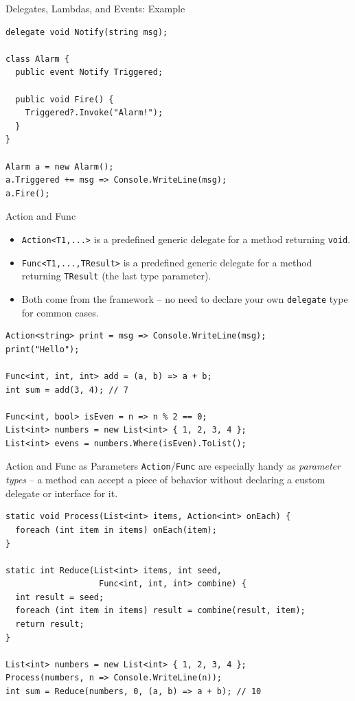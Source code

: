 \begin{frame}[fragile]{Delegates, Lambdas, and Events: Example}
  \begin{lstlisting}
delegate void Notify(string msg);

class Alarm {
  public event Notify Triggered;

  public void Fire() {
    Triggered?.Invoke("Alarm!");
  }
}

Alarm a = new Alarm();
a.Triggered += msg => Console.WriteLine(msg);
a.Fire();
  \end{lstlisting}
\end{frame}

\begin{frame}[fragile]{Action and Func}
  \begin{itemize}
    \item \texttt{Action<T1,...>} is a predefined generic delegate for
      a method returning \texttt{void}.
    \item \texttt{Func<T1,...,TResult>} is a predefined generic delegate
      for a method returning \texttt{TResult} (the last type parameter).
    \item Both come from the framework -- no need to declare your own
      \texttt{delegate} type for common cases.
  \end{itemize}
  \begin{lstlisting}
Action<string> print = msg => Console.WriteLine(msg);
print("Hello");

Func<int, int, int> add = (a, b) => a + b;
int sum = add(3, 4); // 7

Func<int, bool> isEven = n => n % 2 == 0;
List<int> numbers = new List<int> { 1, 2, 3, 4 };
List<int> evens = numbers.Where(isEven).ToList();
  \end{lstlisting}
\end{frame}

\begin{frame}[fragile]{Action and Func as Parameters}
  \texttt{Action}/\texttt{Func} are especially handy as
  \emph{parameter types} -- a method can accept a piece of behavior
  without declaring a custom delegate or interface for it.
  \begin{lstlisting}[basicstyle=\scriptsize\ttfamily]
static void Process(List<int> items, Action<int> onEach) {
  foreach (int item in items) onEach(item);
}

static int Reduce(List<int> items, int seed,
                   Func<int, int, int> combine) {
  int result = seed;
  foreach (int item in items) result = combine(result, item);
  return result;
}

List<int> numbers = new List<int> { 1, 2, 3, 4 };
Process(numbers, n => Console.WriteLine(n));
int sum = Reduce(numbers, 0, (a, b) => a + b); // 10
  \end{lstlisting}
\end{frame}

